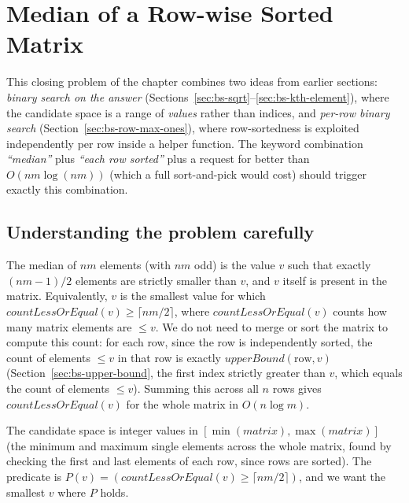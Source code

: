 \section{Median of a Row-wise Sorted Matrix}
\label{sec:bs-matrix-median}


\begin{patternbox}
This closing problem of the chapter combines two ideas from earlier
sections: \emph{binary search on the answer}
(Sections~\ref{sec:bs-sqrt}--\ref{sec:bs-kth-element}), where the
candidate space is a range of \emph{values} rather than indices, and
\emph{per-row binary search} (Section~\ref{sec:bs-row-max-ones}), where
row-sortedness is exploited independently per row inside a helper
function. The keyword combination \emph{``median''} plus \emph{``each row
sorted''} plus a request for better than $O(nm \log(nm))$ (which a full
sort-and-pick would cost) should trigger exactly this combination.
\end{patternbox}

\subsection*{Understanding the problem carefully}

The median of $nm$ elements (with $nm$ odd) is the value $v$ such that
exactly $(nm-1)/2$ elements are strictly smaller than $v$, and $v$ itself
is present in the matrix. Equivalently, $v$ is the smallest value for
which $\textit{countLessOrEqual}(v) \ge \lceil nm/2 \rceil$, where
$\textit{countLessOrEqual}(v)$ counts how many matrix elements are $\le
v$. We do not need to merge or sort the matrix to compute this count: for
each row, since the row is independently sorted, the count of elements
$\le v$ in that row is exactly $\textit{upperBound}(\text{row}, v)$
(Section~\ref{sec:bs-upper-bound}, the first index strictly greater than
$v$, which equals the count of elements $\le v$). Summing this across all
$n$ rows gives $\textit{countLessOrEqual}(v)$ for the whole matrix in
$O(n \log m)$.

\begin{ideabox}
The candidate space is integer values in
$[\min(\textit{matrix}), \max(\textit{matrix})]$ (the minimum and maximum
single elements across the whole matrix, found by checking the first and
last elements of each row, since rows are sorted). The predicate is
$P(v) = (\textit{countLessOrEqual}(v) \ge \lceil nm/2 \rceil)$, and we want
the smallest $v$ where $P$ holds.
\end{ideabox}

